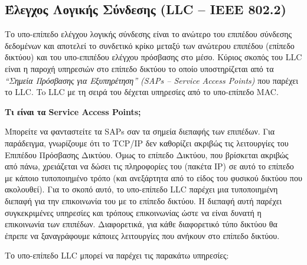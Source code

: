 %
%
\subsection{Έλεγχος Λογικής Σύνδεσης (LLC -- IEEE 802.2)}

Το υπο-επίπεδο ελέγχου λογικής σύνδεσης είναι το ανώτερο του επιπέδου σύνδεσης δεδομένων και αποτελεί το συνδετικό κρίκο μεταξύ των ανώτερου επιπέδου (επίπεδο δικτύου) και του υπο-επιπέδου ελέγχου πρόσβασης στο μέσο. Κύριος σκοπός του LLC είναι η παροχή υπηρεσιών στο επίπεδο δικτύου το οποίο υποστηρίζεται από τα \emph{``Σημεία Πρόσβασης για Εξυπηρέτηση'' (SAPs -- Service Access Points)} που παρέχει το LLC. To LLC με τη σειρά του δέχεται υπηρεσίες από το υπο-επίπεδο MAC.

\begin{inthebox}
\textbf{Τι είναι τα Service Access Points;}

Μπορείτε να φανταστείτε τα SAPs σαν τα σημεία διεπαφής των επιπέδων. Για παράδειγμα, γνωρίζουμε ότι το TCP/IP δεν καθορίζει ακριβώς τις λειτουργίες του Επιπέδου Πρόσβασης Δικτύου. Όμως το επίπεδο Δικτύου, που βρίσκεται ακριβώς από πάνω, χρειάζεται να δώσει τις πληροφορίες του (πακέτα IP) σε αυτό το επίπεδο με κάποιο τυποποιημένο τρόπο (και ανεξάρτητα από το είδος του φυσικού δικτύου που ακολουθεί). Για το σκοπό αυτό, το υπο-επίπεδο LLC παρέχει μια τυποποιημένη διεπαφή για την επικοινωνία του με το επίπεδο δικτύου. Η διεπαφή αυτή παρέχει συγκεκριμένες υπηρεσίες και τρόπους επικοινωνίας ώστε να είναι δυνατή η επικοινωνία των επιπέδων. Διαφορετικά, για κάθε διαφορετικό τύπο δικτύου θα έπρεπε να ξαναγράφουμε κάποιες λειτουργίες που ανήκουν στο επίπεδο δικτύου.\\
\end{inthebox}

Το υπο-επίπεδο LLC μπορεί να παρέχει τις παρακάτω υπηρεσίες:


